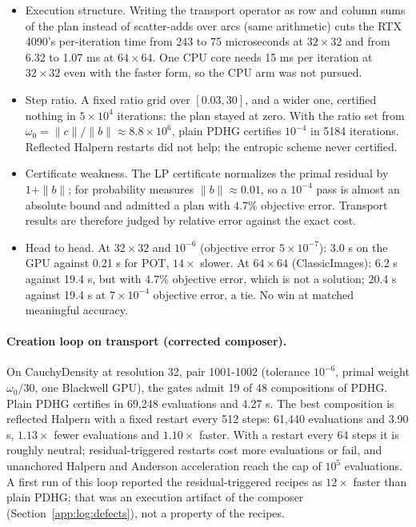 \begin{itemize}
\item Execution structure. Writing the transport operator as row and column
  sums of the plan instead of scatter-adds over arcs (same arithmetic)
  cuts the RTX 4090's per-iteration time from 243 to 75 microseconds at
  $32\times32$ and from 6.32 to 1.07 ms at $64\times64$. One CPU core needs
  15 ms per iteration at $32\times32$ even with the faster form, so the CPU
  arm was not pursued.
\item Step ratio. A fixed ratio grid over $[0.03, 30]$, and a wider one, certified
  nothing in $5\times10^4$ iterations: the plan stayed at zero. With the ratio
  set from $\omega_0 = \|c\|/\|b\| \approx 8.8\times10^6$, plain PDHG certifies
  $10^{-4}$ in 5184 iterations. Reflected Halpern restarts did not help; the
  entropic scheme never certified.
\item Certificate weakness. The LP certificate normalizes the primal residual
  by $1+\|b\|$; for probability measures $\|b\|\approx0.01$, so a $10^{-4}$
  pass is almost an absolute bound and admitted a plan with $4.7\%$
  objective error. Transport results are therefore judged by relative error
  against the exact cost.
\item Head to head. At $32\times32$ and $10^{-6}$ (objective error
  $5\times10^{-7}$): 3.0 s on the GPU against 0.21 s for POT, $14\times$
  slower. At $64\times64$ (ClassicImages): 6.2 s against 19.4 s, but with
  $4.7\%$ objective error, which is not a solution; 20.4 s against 19.4 s at
  $7\times10^{-4}$ objective error, a tie. No win at matched meaningful
  accuracy.
\end{itemize}

\paragraph{Creation loop on transport (corrected composer).}
On CauchyDensity at resolution 32, pair 1001-1002 (tolerance $10^{-6}$, primal
weight $\omega_0/30$, one Blackwell GPU), the gates admit 19 of 48 compositions
of PDHG. Plain PDHG certifies in 69,248 evaluations and 4.27 s. The best
composition is reflected Halpern with a fixed restart every 512 steps: 61,440
evaluations and 3.90 s, $1.13\times$ fewer evaluations and $1.10\times$ faster.
With a restart every 64 steps it is roughly neutral; residual-triggered restarts
cost more evaluations or fail, and unanchored Halpern and Anderson acceleration
reach the cap of $10^5$ evaluations. A first run of this loop reported the
residual-triggered recipes as $12\times$ faster than plain PDHG; that was an
execution artifact of the composer (Section~\ref{app:log:defects}), not a
property of the recipes.


